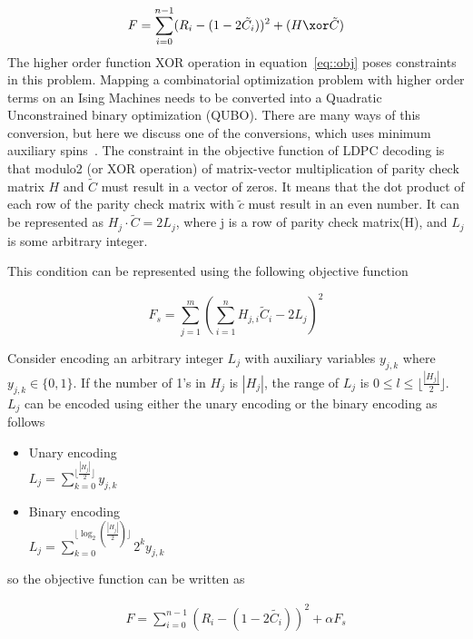 \begin{equation}
\label{eq::obj}
\begin{split}
    F = \sum_{i=0}^{n-1}(R_i - (1-2\tilde{C_i}))^2 +  (H \xor \tilde{C})
\end{split}
\end{equation}
The higher order function XOR operation in equation~\ref{eq::obj} poses constraints in this problem. Mapping a combinatorial optimization problem with higher order terms on an Ising Machines needs to be converted into a  Quadratic Unconstrained binary optimization (QUBO). There are many ways of this conversion, but here we discuss one of the conversions, which uses minimum auxiliary spins~\cite{tawada2020new}. The constraint in the objective function of LDPC decoding is that modulo2 (or XOR operation) of matrix-vector multiplication of parity check matrix $H$ and $\tilde{C}$ must result in a vector of zeros. It means that the dot product of each row of the parity check matrix with $\tilde{c}$ must result in an even number. It can be represented as $H_j \cdot \tilde{C} = 2L_j$, where j is a row of parity check matrix(H), and $L_j$ is some arbitrary integer.

This condition can be represented using the following objective function

\begin{equation}
    F_s = \sum_{j=1}^{m}(\sum_{i=1}^{n} H_{j,i}\tilde{C}_i - 2L_j)^2
\end{equation}

Consider encoding an arbitrary integer $L_j$ with auxiliary variables
$y_{j,k}$ where $y_{j,k} \in \{0,1\}$. If the number of 1’s in $H_j$ is $|H_j|$, the range of $L_j$ is $0 \leq l \leq \lfloor \frac{|H_j|}{2} \rfloor $. $L_j$ can be encoded using either the unary encoding or the binary encoding as follows 

\begin{itemize}
    \item Unary encoding \\
             $L_j = \sum_{k=0}^{\lfloor \frac{|H_j|}{2} \rfloor} y_{j,k}$
    \item Binary encoding \\
             $L_j = \sum_{k=0}^{\lfloor \log_2 (\frac{|H_j|}{2})\rfloor} 2^k y_{j,k}$
\end{itemize}

so the objective function can be written as 

\begin{equation}
\label{eq::obj_ising}
\begin{split}
    F = \sum_{i=0}^{n-1}(R_i - (1-2\tilde{C_i}))^2 + \alpha F_s
\end{split}
\end{equation}

